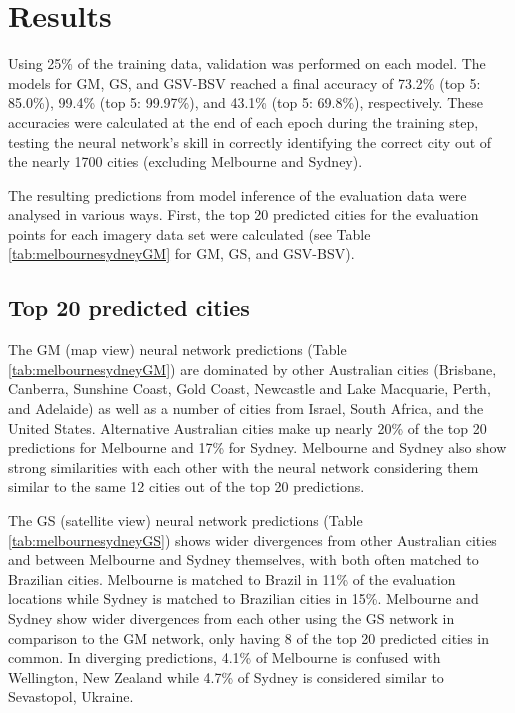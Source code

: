 \documentclass[Crown,sageh,times]{sagej}
\begin{document}
\section{Results}\label{sec:results}

Using 25\% of the training data, validation was performed on each model. The models for GM, GS, and GSV-BSV reached a final accuracy of 73.2\% (top 5: 85.0\%), 99.4\% (top 5: 99.97\%), and 43.1\% (top 5: 69.8\%), respectively. These accuracies were calculated at the end of each epoch during the training step, testing the neural network's skill in correctly identifying the correct city out of the nearly 1700 cities (excluding Melbourne and Sydney).


The resulting predictions from model inference of the evaluation data were analysed in various ways. First, the top 20 predicted cities for the evaluation points for each imagery data set were calculated (see Table \ref{tab:melbournesydneyGM} for GM, GS, and GSV-BSV).

\subsection{Top 20 predicted cities} 

The GM (map view) neural network predictions (Table \ref{tab:melbournesydneyGM}) are dominated by other Australian cities (Brisbane, Canberra, Sunshine Coast, Gold Coast, Newcastle and Lake Macquarie, Perth, and Adelaide) as well as a number of cities from Israel, South Africa, and the United States. Alternative Australian cities make up nearly 20\% of the top 20 predictions for Melbourne and 17\% for Sydney. Melbourne and Sydney also show strong similarities with each other with the neural network considering them similar to the same 12 cities out of the top 20 predictions.


The GS (satellite view) neural network predictions (Table \ref{tab:melbournesydneyGS}) shows wider divergences from other Australian cities and between Melbourne and Sydney themselves, with both often matched to Brazilian cities. Melbourne is matched to Brazil in 11\% of the evaluation locations while Sydney is matched to Brazilian cities in 15\%. Melbourne and Sydney show wider divergences from each other using the GS network in comparison to the GM network, only having 8 of the top 20 predicted cities in common. In diverging predictions, 4.1\% of Melbourne is confused with Wellington, New Zealand while 4.7\% of Sydney is considered similar to Sevastopol, Ukraine. 
\end{document}
